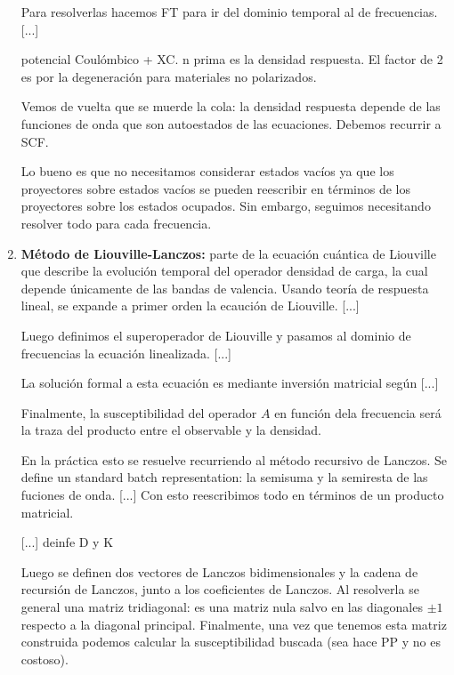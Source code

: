 \begin{enumerate}
      Para resolverlas hacemos FT para ir del dominio temporal al de frecuencias.
        [...]


      potencial Coulómbico + XC. n prima es la densidad respuesta. El factor de 2 es por la degeneración para materiales no polarizados.

      Vemos de vuelta que se muerde la cola: la densidad respuesta depende de las funciones de onda que son autoestados de las ecuaciones. Debemos recurrir a SCF.

      Lo bueno es que no necesitamos considerar estados vacíos ya que los proyectores sobre estados vacíos se pueden reescribir en términos de los proyectores sobre los estados ocupados. Sin embargo, seguimos necesitando resolver todo para cada frecuencia.
      \item \textbf{Método de Liouville-Lanczos:} parte de la ecuación cuántica de Liouville que describe la evolución temporal del operador densidad de carga, la cual depende únicamente de las bandas de valencia. Usando teoría de respuesta lineal, se expande a primer orden la ecaución de Liouville.
        [...]

      Luego definimos el superoperador de Liouville y pasamos al dominio de frecuencias la ecuación linealizada.
        [...]

      La solución formal a esta ecuación es mediante inversión matricial según
        [...]

      Finalmente, la susceptibilidad del operador $A$ en función dela frecuencia será la traza del producto entre el observable y la densidad.

      En la práctica esto se resuelve recurriendo al método recursivo de Lanczos. Se define un standard batch representation: la semisuma y la semiresta de las fuciones de onda. [...] Con esto reescribimos todo en términos de un producto matricial.

      [...] deinfe D y K

      Luego se definen dos vectores de Lanczos bidimensionales y la cadena de recursión de Lanczos, junto a los coeficientes de Lanczos. Al resolverla se general una matriz tridiagonal: es una matriz nula salvo en las diagonales $\pm 1$ respecto a la diagonal principal. Finalmente, una vez que tenemos esta matriz construida podemos calcular la susceptibilidad buscada (sea hace PP y no es costoso).


\end{enumerate}
